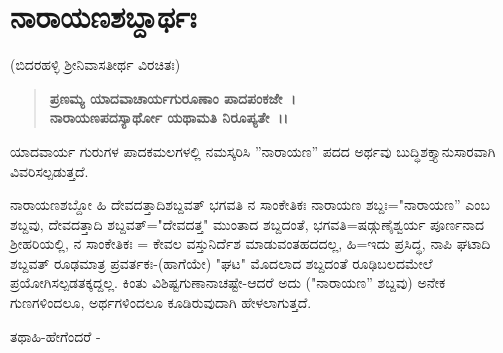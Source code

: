 

\begin{center}
\end{center}

\begin{center}
\end{center}

\begin{center}
\phantom{ನರಸಿಂಹೋಖಿಲಾಜ್ಞಾನಮತಧ್ವಾಂತದಿವಾಕರಃ~।}
\end{center}

\begin{center}
\phantom{\phantom{ಜಯತ್ಯಮಿತಸುಜ್ಞಾನಸುಖಶಕ್ತಿಪಯೋನಿಧಿ:~।।}}
\end{center}

\begin{center}
\phantom{ನ ಮಾಧವಸಮೋ ದೇವೋ ನ ಚ ಮಧ್ವಸಮೋ ಗುರುಃ~।}
\end{center}

\begin{center}
\phantom{\phantom{ನ ತದ್ವಾಕ್ಯಸಮಂ ಶಾಸ್ತ್ರಂ ನ ಚ ತಸ್ಯ ಸಮಃ ಪುಮಾನ್~।।}}
\end{center}

\chapter{ನಾರಾಯಣಶಬ್ದಾರ್ಥಃ}

\begin{center}
(ಬಿದರಹಳ್ಳಿ ಶ‍್ರೀನಿವಾಸತೀರ್ಥ ವಿರಚಿತಃ)
\end{center}

\begin{verse}
 \textbf{ಪ್ರಣಮ್ಯ ಯಾದವಾಚಾರ್ಯಗುರೂಣಾಂ ಪಾದಪಂಕಜೇ~।}\\\textbf{ನಾರಾಯಣಪದಸ್ಯಾರ್ಥೋ ಯಥಾಮತಿ ನಿರೂಪ್ಯತೇ~।।}
\end{verse}

ಯಾದವಾರ್ಯ ಗುರುಗಳ ಪಾದಕಮಲಗಳಲ್ಲಿ ನಮಸ್ಕರಿಸಿ ''ನಾರಾಯಣ'' ಪದದ ಅರ್ಥವು ಬುದ್ಧಿಶಕ್ತ್ಯಾನುಸಾರವಾಗಿ ವಿವರಿಸಲ್ಪಡುತ್ತದೆ.

ನಾರಾಯಣಶಬ್ದೋ ಹಿ ದೇವದತ್ತಾದಿಶಬ್ದವತ್ ಭಗವತಿ ನ ಸಾಂಕೇತಿಕಃ ನಾರಾಯಣ ಶಬ್ದಃ="ನಾರಾಯಣ'' ಎಂಬ ಶಬ್ದವು, ದೇವದತ್ತಾದಿ ಶಬ್ದವತ್="ದೇವದತ್ತ" ಮುಂತಾದ ಶಬ್ದದಂತೆ, ಭಗವತಿ=ಷಡ್ಗುಣೈಶ್ವರ್ಯ ಪೂರ್ಣನಾದ ಶ‍್ರೀಹರಿಯಲ್ಲಿ, ನ ಸಾಂಕೇತಿಕಃ = ಕೇವಲ ವಸ್ತುನಿರ್ದೆಶ ಮಾಡುವಂತಹದದಲ್ಲ, ಹಿ=ಇದು ಪ್ರಸಿದ್ಧ, ನಾಪಿ ಘಟಾದಿ ಶಬ್ದವತ್ ರೂಢಮಾತ್ರ ಪ್ರವರ್ತಕಃ-(ಹಾಗೆಯೇ) "ಘಟ" ಮೊದಲಾದ ಶಬ್ದದಂತೆ ರೂಢಿಬಲದಮೇಲೆ ಪ್ರಯೋಗಿಸಲ್ಪಡತಕ್ಕದ್ದಲ್ಲ. ಕಿಂತು ವಿಶಿಷ್ಟಗುಣಾನಾಚಷ್ಟೇ-ಆದರೆ ಅದು ("ನಾರಾಯಣ'' ಶಬ್ದವು) ಅನೇಕ ಗುಣಗಳಿಂದಲೂ, ಅರ್ಥಗಳಿಂದಲೂ ಕೂಡಿರುವುದಾಗಿ ಹೇಳಲಾಗುತ್ತದೆ.

\medskip

\noindent
ತಥಾಹಿ-ಹೇಗೆಂದರೆ -

